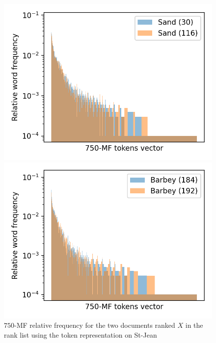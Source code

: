 \begin{figure}
  \centering
  \caption{$750$-MF relative frequency for the two documents ranked $X$ in the rank list using the token representation on St-Jean}

  \label{fig:mf_vector_first_rl}
  \includegraphics[width=\linewidth]{img/mf_vector_first_rl.png}

  \vspace{0.5cm}

  \label{fig:mf_vector_first_last_rl}
  \includegraphics[width=\linewidth]{img/mf_vector_first_last_rl.png}

  \vspace{0.5cm}


\end{figure}
